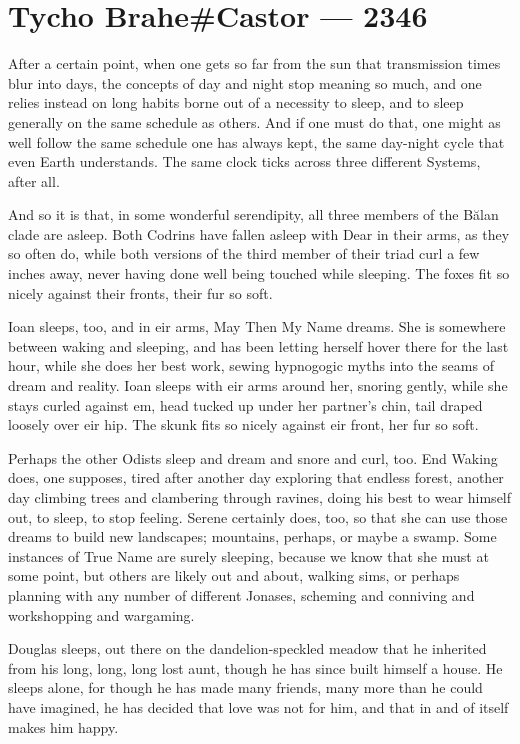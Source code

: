 \hypertarget{tycho-brahecastor-2346}{%
\chapter{Tycho Brahe\#Castor — 2346}\label{tycho-brahecastor-2346}}

After a certain point, when one gets so far from the sun that transmission times blur into days, the concepts of day and night stop meaning so much, and one relies instead on long habits borne out of a necessity to sleep, and to sleep generally on the same schedule as others. And if one must do that, one might as well follow the same schedule one has always kept, the same day-night cycle that even Earth understands. The same clock ticks across three different Systems, after all.

And so it is that, in some wonderful serendipity, all three members of the Bălan clade are asleep. Both Codrins have fallen asleep with Dear in their arms, as they so often do, while both versions of the third member of their triad curl a few inches away, never having done well being touched while sleeping. The foxes fit so nicely against their fronts, their fur so soft.

Ioan sleeps, too, and in eir arms, May Then My Name dreams. She is somewhere between waking and sleeping, and has been letting herself hover there for the last hour, while she does her best work, sewing hypnogogic myths into the seams of dream and reality. Ioan sleeps with eir arms around her, snoring gently, while she stays curled against em, head tucked up under her partner's chin, tail draped loosely over eir hip. The skunk fits so nicely against eir front, her fur so soft.

Perhaps the other Odists sleep and dream and snore and curl, too. End Waking does, one supposes, tired after another day exploring that endless forest, another day climbing trees and clambering through ravines, doing his best to wear himself out, to sleep, to stop feeling. Serene certainly does, too, so that she can use those dreams to build new landscapes; mountains, perhaps, or maybe a swamp. Some instances of True Name are surely sleeping, because we know that she must at some point, but others are likely out and about, walking sims, or perhaps planning with any number of different Jonases, scheming and conniving and workshopping and wargaming.

Douglas sleeps, out there on the dandelion-speckled meadow that he inherited from his long, long, long lost aunt, though he has since built himself a house. He sleeps alone, for though he has made many friends, many more than he could have imagined, he has decided that love was not for him, and that in and of itself makes him happy.

